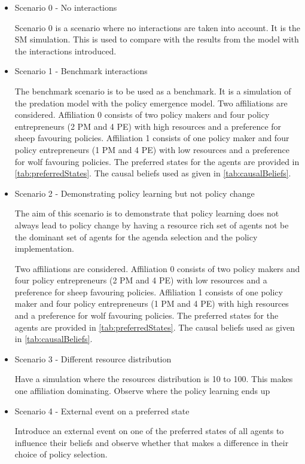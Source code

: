 \documentclass[12pt]{article}
\begin{document}
\begin{itemize}
\item Scenario 0 - No interactions

Scenario 0 is a scenario where no interactions are taken into account. It is the SM simulation. This is used to compare with the results from the model with the interactions introduced.


\item Scenario 1 - Benchmark interactions

The benchmark scenario is to be used as a benchmark. It is a simulation of the predation model with the policy emergence model. Two affiliations are considered. Affiliation 0 consists of two policy makers and four policy entrepreneurs (2 PM and 4 PE) with high resources and a preference for sheep favouring policies. Affiliation 1 consists of one policy maker and four policy entrepreneurs (1 PM and 4 PE) with low resources and a preference for wolf favouring policies. The preferred states for the agents are provided in \autoref{tab:preferredStates}. The causal beliefs used as given in \autoref{tab:causalBeliefs}.

\item Scenario 2 - Demonstrating policy learning but not policy change

The aim of this scenario is to demonstrate that policy learning does not always lead to policy change by having a resource rich set of agents not be the dominant set of agents for the agenda selection and the policy implementation.

Two affiliations are considered. Affiliation 0 consists of two policy makers and four policy entrepreneurs (2 PM and 4 PE) with low resources and a preference for sheep favouring policies. Affiliation 1 consists of one policy maker and four policy entrepreneurs (1 PM and 4 PE) with high resources and a preference for wolf favouring policies. The preferred states for the agents are provided in \autoref{tab:preferredStates}. The causal beliefs used as given in \autoref{tab:causalBeliefs}.

\item Scenario 3 - Different resource distribution

Have a simulation where the resources distribution is 10 to 100. This makes one affiliation dominating. Observe where the policy learning ends up

\item Scenario 4 - External event on a preferred state

Introduce an external event on one of the preferred states of all agents to influence their beliefs and observe whether that makes a difference in their choice of policy selection.

\end{itemize}
\end{document}
